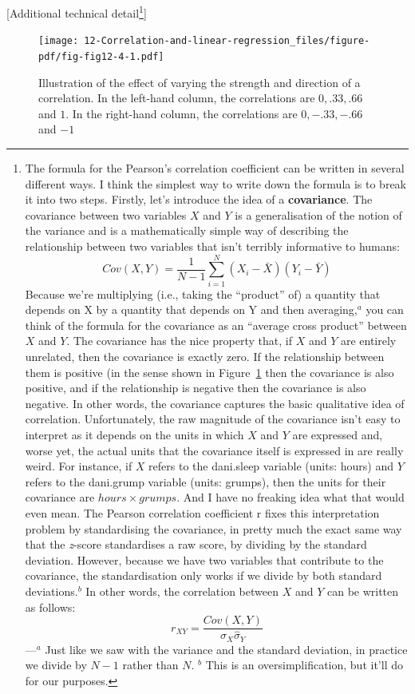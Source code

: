\documentclass[
  a4paper,
]{book}
\begin{document}
{[}Additional technical detail\footnote{The formula for the Pearson's
  correlation coefficient can be written in several different ways. I
  think the simplest way to write down the formula is to break it into
  two steps. Firstly, let's introduce the idea of a \textbf{covariance}.
  The covariance between two variables \(X\) and \(Y\) is a
  generalisation of the notion of the variance and is a mathematically
  simple way of describing the relationship between two variables that
  isn't terribly informative to humans:
  \[Cov(X,Y)=\frac{1}{N-1}\sum_{i=1}^N(X_i-\bar{X})(Y_i-\bar{Y})\]
  Because we're multiplying (i.e., taking the ``product'' of) a quantity
  that depends on X by a quantity that depends on Y and then
  averaging,\(^a\) you can think of the formula for the covariance as an
  ``average cross product'' between \(X\) and \(Y\). The covariance has
  the nice property that, if \(X\) and \(Y\) are entirely unrelated,
  then the covariance is exactly zero. If the relationship between them
  is positive (in the sense shown in Figure~\ref{fig-fig12-4} then the
  covariance is also positive, and if the relationship is negative then
  the covariance is also negative. In other words, the covariance
  captures the basic qualitative idea of correlation. Unfortunately, the
  raw magnitude of the covariance isn't easy to interpret as it depends
  on the units in which \(X\) and \(Y\) are expressed and, worse yet,
  the actual units that the covariance itself is expressed in are really
  weird. For instance, if \(X\) refers to the dani.sleep variable
  (units: hours) and \(Y\) refers to the dani.grump variable (units:
  grumps), then the units for their covariance are
  \(hours \times grumps\). And I have no freaking idea what that would
  even mean. The Pearson correlation coefficient r fixes this
  interpretation problem by standardising the covariance, in pretty much
  the exact same way that the \emph{z}-score standardises a raw score,
  by dividing by the standard deviation. However, because we have two
  variables that contribute to the covariance, the standardisation only
  works if we divide by both standard deviations.\(^b\) In other words,
  the correlation between \(X\) and \(Y\) can be written as follows:
  \[r_{XY}=\frac{Cov(X,Y)}{\hat{\sigma}_X\hat{\sigma}_Y}\]---\(^a\) Just
  like we saw with the variance and the standard deviation, in practice
  we divide by \(N - 1\) rather than \(N\). \(^b\) This is an
  oversimplification, but it'll do for our purposes.}{]}

\begin{figure}[h!]

\texttt{[image: 12-Correlation-and-linear-regression\_files/figure-pdf/fig-fig12-4-1.pdf]} \hfill{}

\caption{\label{fig-fig12-4}Illustration of the effect of varying the
strength and direction of a correlation. In the left-hand column, the
correlations are \(0, .33, .66\) and \(1\). In the right-hand column,
the correlations are \(0, -.33, -.66\) and \(-1\)}

\end{figure}
\end{document}
